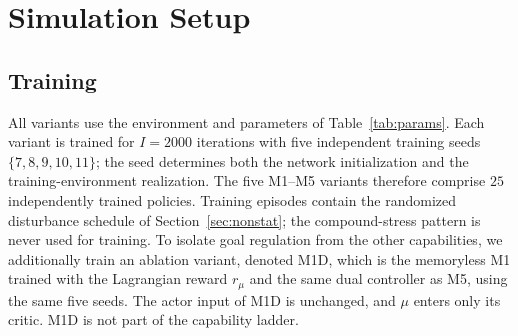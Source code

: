 \documentclass[journal]{IEEEtran}
\begin{document}
\section{Simulation Setup}
\label{sec:setup}

\subsection{Training}
All variants use the environment and parameters of Table~\ref{tab:params}.
Each variant is trained for $I=2000$ iterations with five independent
training seeds $\{7,8,9,10,11\}$; the seed determines both the network
initialization and the training-environment realization. The five M1--M5
variants therefore comprise $25$ independently trained policies. Training
episodes contain the randomized disturbance schedule of
Section~\ref{sec:nonstat}; the compound-stress pattern is never used for
training. To isolate goal regulation from the other capabilities, we
additionally train an ablation variant, denoted M1D, which is the memoryless
M1 trained with the Lagrangian reward $r_\mu$ and the same dual controller as
M5, using the same five seeds. The actor input of M1D is unchanged, and $\mu$
enters only its critic. M1D is not part of the capability ladder.
\end{document}
